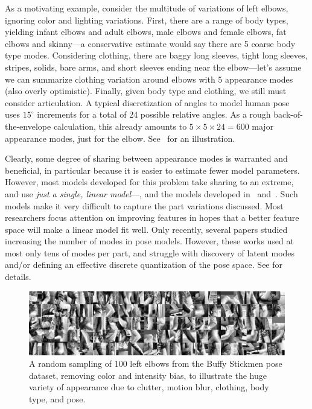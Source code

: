 As a motivating example, consider the multitude of variations of left elbows, 
ignoring color and lighting variations.  First, there are a range of body 
types, yielding infant elbows and adult elbows, male elbows and female elbows, 
fat elbows and skinny---a conservative estimate would say there are 5 coarse 
body type modes.  Considering clothing, there are baggy long sleeves, tight 
long sleeves, stripes, solids, bare arms, and short sleeves ending near the 
elbow---let's assume we can summarize clothing variation around elbows with 5 
appearance modes (also overly optimistic).  Finally, given body type and 
clothing, we still must consider articulation.  A typical discretization of 
angles to model human pose~\citep{felz05,devacrf,eichner09} uses $15^\circ$ 
increments for a total of 24 possible relative angles.  As a rough 
back-of-the-envelope calculation, this already amounts to $5 \times 5 \times 24 
= 600$ major appearance modes, just for the elbow.  See~ for an 
illustration.


Clearly, some degree of sharing between appearance modes is warranted and 
beneficial, in particular because it is easier to estimate fewer model 
parameters.  However, most models developed for this problem take sharing to an 
extreme, and use {\em just a single, linear model}---\eg, 
\citet{devacrf,eichner09,andriluka09,ddtran} and the models developed 
in~ and~.
Such models make it very difficult to capture the part variations discussed.  
Most researchers focus attention on improving features in hopes that a better 
feature space will make a linear model fit well.  Only recently, several papers 
studied increasing the number of modes in pose models. However, these works 
used at most only tens of modes per part, and struggle with discovery of latent 
modes and/or defining an effective discrete quantization of the pose space.  
See  for details.

\begin{figure}[tb!]
\centering
\includegraphics[width=0.99\linewidth]{figs/lelbs.jpg}
\caption[Elbow sample patches.]{ \label{fig:lelbs} A random sampling of 100 
left elbows from the Buffy Stickmen pose dataset, removing color and intensity 
bias, to illustrate the huge variety of appearance due to clutter, motion blur, 
clothing, body type, and pose.}
\end{figure}

